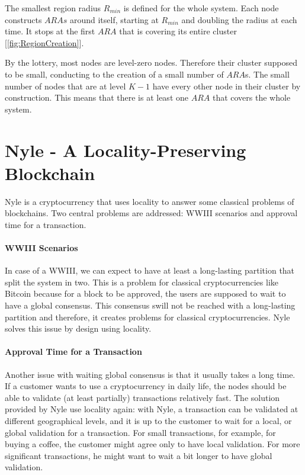 \documentclass[a4paper,11pt,oneside]{report}
\begin{document}
The smallest region radius $R_{min}$ is defined for the whole system. Each node
constructs $ARAs$ around itself, starting at $R_{min}$ and doubling the
radius at each time. It stops at the first $ARA$ that is covering its entire
cluster [\autoref{fig:RegionCreation}]. 

By the lottery, most nodes are level-zero nodes. Therefore their cluster
supposed to be small, conducting to the creation of a small number of $ARA$s.
The small number of nodes that are at level $K-1$ have every other node
in their cluster by construction. This means that there is  at least one
$ARA$ that covers the whole system. 

\section{Nyle - A Locality-Preserving Blockchain}

Nyle is a cryptocurrency that uses locality to answer some classical problems
of blockchains. Two central problems are addressed: WWIII scenarios and approval
time for a transaction.
 
\paragraph{WWIII Scenarios} \label{WWIII} In case of a WWIII, we can expect to
have at least a long-lasting partition that split the system in two. This
is a problem for classical cryptocurrencies like Bitcoin \cite{Nakamoto2009}
because for a block to be approved, the users are supposed to wait to have a
global consensus. This consensus swill not be reached with a long-lasting
partition and therefore, it creates problems for classical cryptocurrencies.
Nyle solves this issue by design using locality.

\paragraph{Approval Time for a Transaction} \label{approve_time} Another issue
with waiting global consensus is that it usually takes a long time. If a
customer wants to use a cryptocurrency in daily life, the nodes should be able
to validate (at least partially) transactions relatively fast. The solution
provided by Nyle use locality again: with Nyle, a transaction can be validated
at different geographical levels, and it is up to the customer to wait for a
local, or global validation for a transaction. For small transactions, for
example, for buying a coffee, the customer might agree only to have local
validation. For more significant transactions, he might want to wait a bit longer to have
global validation.
\end{document}

